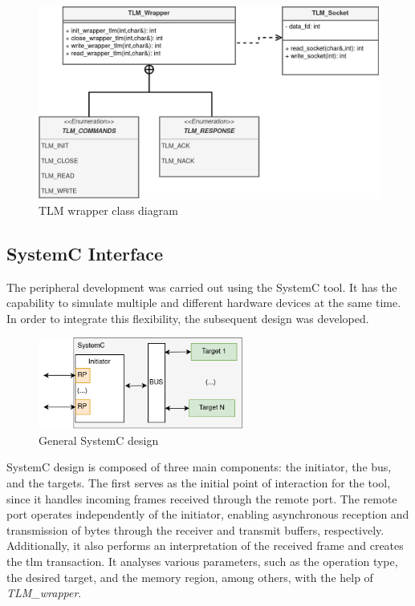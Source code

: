 \begin{figure}[!ht]
	\centering
 	\includegraphics[width=0.7\linewidth]{Images/TLM_Wrapper_ClassDiagram.png} 
 	\caption{TLM wrapper class diagram}
	\label{fig_TLM_Wrapper_ClassDiagram}
\end{figure}

\subsection{SystemC Interface}

The peripheral development was carried out using the SystemC tool. It has the capability to simulate multiple and different hardware devices 
at the same time. In order to integrate this flexibility, the subsequent design was developed.

\begin{figure}[H]
	\centering
	\includegraphics[width=0.6\textwidth]{Images/SystemCdesign.png}
	\caption{General SystemC design}
	\label{fig_SystemCdesign_geral}
\end{figure}


SystemC design is composed of three main components: the initiator, the bus, and the targets. The first serves as the initial 
point of interaction for the tool, since it handles incoming frames received through the remote port. The remote port operates independently 
of the initiator, enabling asynchronous reception and transmission of bytes through the receiver and transmit buffers, respectively.
Additionally, it also performs an interpretation of the received frame and creates the \gls{tlm} transaction. It analyses various 
parameters, such as the operation type, the desired target, and the memory region, among others, with the help of \textit{TLM\_wrapper}.

